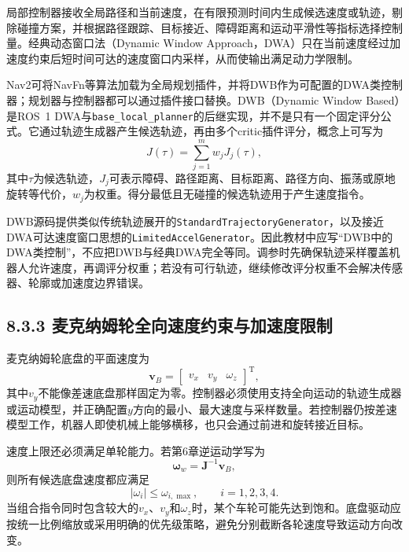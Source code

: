 \documentclass[UTF8,zihao=-4]{ctexart}
\begin{document}
局部控制器接收全局路径和当前速度，在有限预测时间内生成候选速度或轨迹，剔除碰撞方案，并根据路径跟踪、目标接近、障碍距离和运动平滑性等指标选择控制量。经典动态窗口法（Dynamic Window Approach，DWA）只在当前速度经过加速度约束后短时间可达的速度窗口内采样，从而使输出满足动力学限制。

Nav2可将NavFn等算法加载为全局规划插件，并将DWB作为可配置的DWA类控制器；规划器与控制器都可以通过插件接口替换\cite{macenski2020nav2}。DWB（Dynamic Window Based）是ROS~1 DWA与\texttt{base\_local\_planner}的后继实现，并不是只有一个固定评分公式。它通过轨迹生成器产生候选轨迹，再由多个critic插件评分，概念上可写为
\begin{equation}
  J(\tau)=\sum_{j=1}^{m}w_j J_j(\tau),
  \label{eq:dwb-score}
\end{equation}
其中$\tau$为候选轨迹，$J_j$可表示障碍、路径距离、目标距离、路径方向、振荡或原地旋转等代价，$w_j$为权重。得分最低且无碰撞的候选轨迹用于产生速度指令\cite{navigation2source}。

DWB源码提供类似传统轨迹展开的\texttt{StandardTrajectoryGenerator}，以及接近DWA可达速度窗口思想的\texttt{LimitedAccelGenerator}。因此教材中应写“DWB中的DWA类控制”，不应把DWB与经典DWA完全等同。调参时先确保轨迹采样覆盖机器人允许速度，再调评分权重；若没有可行轨迹，继续修改评分权重不会解决传感器、轮廓或加速度边界错误。

\subsection*{8.3.3 麦克纳姆轮全向速度约束与加速度限制}

麦克纳姆轮底盘的平面速度为
\begin{equation}
  \bm{v}_B=
  \begin{bmatrix}v_x&v_y&\omega_z\end{bmatrix}^{\mathrm T},
\end{equation}
其中$v_y$不能像差速底盘那样固定为零。控制器必须使用支持全向运动的轨迹生成器或运动模型，并正确配置$y$方向的最小、最大速度与采样数量。若控制器仍按差速模型工作，机器人即使机械上能够横移，也只会通过前进和旋转接近目标。

速度上限还必须满足单轮能力。若第6章逆运动学写为
\begin{equation}
  \bm{\omega}_w=\bm{J}^{-1}\bm{v}_B,
\end{equation}
则所有候选底盘速度都应满足
\begin{equation}
  \left|\omega_i\right|\le \omega_{i,\max},\qquad i=1,2,3,4.
  \label{eq:wheel-speed-limit}
\end{equation}
当组合指令同时包含较大的$v_x$、$v_y$和$\omega_z$时，某个车轮可能先达到饱和。底盘驱动应按统一比例缩放或采用明确的优先级策略，避免分别截断各轮速度导致运动方向改变。
\end{document}
